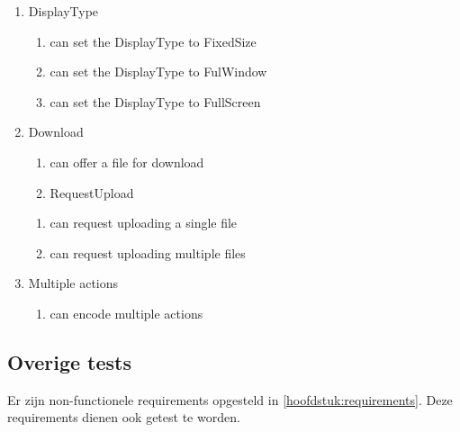 \begin{enumerate}[label={T\arabic*}]
\begin{enumerate}[label={T\arabic{enumi}.\arabic*}]
\begin{enumerate}[label={T\arabic{enumi}.\arabic{enumii}.\arabic*}]
\begin{enumerate}[label={T\arabic{enumi}.\arabic{enumii}.\arabic{enumiii}.\arabic*}]
            \end{enumerate}
            \item DisplayType
	        \begin{enumerate}[label={T\arabic{enumi}.\arabic{enumii}.\arabic{enumiii}.\arabic*}]
            	\item can set the DisplayType to FixedSize
            	\item can set the DisplayType to FulWindow
            	\item can set the DisplayType to FullScreen
            \end{enumerate}
            \item Download
	        \begin{enumerate}[label={T\arabic{enumi}.\arabic{enumii}.\arabic{enumiii}.\arabic*}]
            	\item can offer a file for download
	            \item RequestUpload
            \end{enumerate}
	        \begin{enumerate}[label={T\arabic{enumi}.\arabic{enumii}.\arabic{enumiii}.\arabic*}]
            	\item can request uploading a single file
            	\item can request uploading multiple files
            \end{enumerate}
            \item Multiple actions
	        \begin{enumerate}[label={T\arabic{enumi}.\arabic{enumii}.\arabic{enumiii}.\arabic*}]
        		\item can encode multiple actions
	        \end{enumerate}
        \end{enumerate}
	\end{enumerate}
	\setcounter{startvaluetest}{\value{enumi}}
\end{enumerate}

\subsection{Overige tests}
Er zijn non-functionele requirements opgesteld in \autoref{hoofdstuk:requirements}. Deze requirements dienen ook getest te worden.

